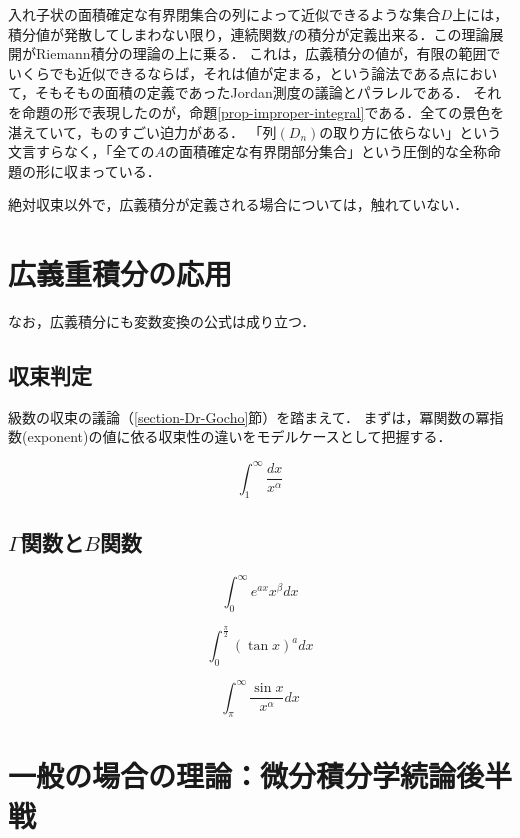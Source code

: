 \documentclass[uplatex, dvipdfmx]{jsreport}
\begin{document}
\begin{screen}
    入れ子状の面積確定な有界閉集合の列によって近似できるような集合$D$上には，積分値が発散してしまわない限り，連続関数$f$の積分が定義出来る．この理論展開がRiemann積分の理論の上に乗る．
    これは，広義積分の値が，有限の範囲でいくらでも近似できるならば，それは値が定まる，という論法である点において，そもそもの面積の定義であったJordan測度の議論とパラレルである．
    それを命題の形で表現したのが，命題\ref{prop-improper-integral}である．全ての景色を湛えていて，ものすごい迫力がある．
    「列$(D_n)$の取り方に依らない」という文言すらなく，「全ての$A$の面積確定な有界閉部分集合」という圧倒的な全称命題の形に収まっている．

    絶対収束以外で，広義積分が定義される場合については，触れていない．
\end{screen}

\section{広義重積分の応用}
なお，広義積分にも変数変換の公式は成り立つ．

\subsection{収束判定}
級数の収束の議論（\ref{section-Dr-Gocho}節）を踏まえて．
まずは，冪関数の冪指数(exponent)の値に依る収束性の違いをモデルケースとして把握する．

\begin{proposition}
    \[ \int^\infty_1\frac{dx}{x^\alpha} \]
\end{proposition}

\subsection{$\Gamma$関数と$B$関数}

\begin{reidai}
    \[ \int^\infty_0e^{ax}x^\beta dx \]
\end{reidai}
\begin{reidai}
    \[ \int^\frac{\pi}{2}_0(\tan x)^adx \]
\end{reidai}
\begin{reidai}
    \[ \int^\infty_\pi\frac{\sin x}{x^\alpha}dx \]
\end{reidai}

\section{一般の場合の理論：微分積分学続論後半戦}
\end{document}

